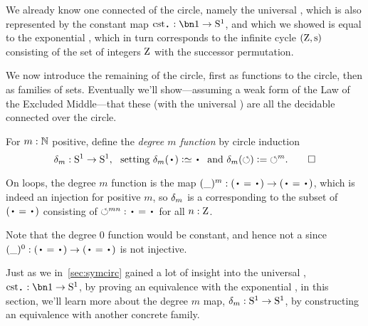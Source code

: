 We already know one connected \covering of the circle, namely the universal \covering, which is also represented by the constant map $\cst\base:\bn 1\to\Sc$, and which we showed is equal to the exponential \covering, which in turn corresponds to the infinite cycle $(\zet,\zs)$
consisting of the set of integers $\mathrm{Z}$ with the successor permutation.

We now introduce the remaining \coverings of the circle, first as functions to the circle, then as families of sets.
Eventually we'll show---assuming a weak form
of the Law of the Excluded Middle---that these (with the universal \covering)
are all the decidable connected \coverings over the circle.

\begin{definition}\label{def:mfoldS1cover}
For $m:\mathbb{N}$ positive, define the \emph{degree $m$ function} by circle induction
\[
\dg{m}:\Sc\to \Sc, \text{~~setting~}
\dg{m}(\base)\defeq\base \text{~~and~}
\dg{m}(\Sloop)\defis{\Sloop}^m.\qedhere
\]
\end{definition}
On loops, the degree $m$ function is the map
$(\blank)^m : (\base=\base) \to (\base=\base)$,
which is indeed an injection for positive $m$,
so $\delta_{m}$ is a \covering corresponding to the subset of $(\base=\base)$ consisting
of ${\Sloop}^{mn} : \base=\base$ for all $n:\mathrm{Z}$.

Note that the degree $0$ function would be constant,
and hence not a \covering since $(\blank)^0 : (\base=\base) \to (\base=\base)$
is not injective.

Just as we in~\cref{sec:symcirc} gained a lot of insight into the universal \covering, 
$\cst\base:\bn 1\to\Sc$,
by proving an equivalence with the exponential \covering,
in this section, we'll learn more about the degree $m$ map,
$\delta_{m}:{\mathrm{S}^1}\to{\mathrm{S}^1}$,
by constructing an equivalence with another concrete family.


